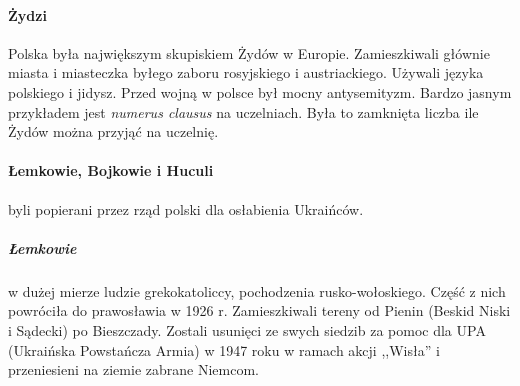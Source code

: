 \documentclass [a4paper, 11pt, oneside]{book}
\begin{document}
            \paragraph{Żydzi} Polska była największym skupiskiem Żydów w Europie. Zamieszkiwali głównie miasta i miasteczka byłego zaboru rosyjskiego i austriackiego. Używali języka polskiego i jidysz. Przed wojną w polsce był mocny antysemityzm. Bardzo jasnym przykładem jest \emph{numerus clausus} na uczelniach. Była to zamknięta liczba ile Żydów można przyjąć na uczelnię.
            \paragraph{Łemkowie, Bojkowie i Huculi} byli popierani przez rząd polski dla osłabienia Ukraińców.
                \subparagraph{Łemkowie} w dużej mierze ludzie grekokatoliccy, pochodzenia rusko-wołoskiego. Część z nich powróciła do prawosławia w 1926 r. Zamieszkiwali tereny od Pienin (Beskid Niski i Sądecki) po Bieszczady. Zostali usunięci ze swych siedzib za pomoc dla UPA (Ukraińska Powstańcza Armia) w 1947 roku w ramach akcji ,,Wisła'' i przeniesieni na ziemie zabrane Niemcom.
\end{document}
